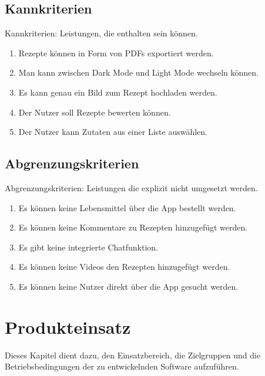 \documentclass[parskip=full]{scrartcl}
\begin{document}
\subsection{Kannkriterien}
Kannkriterien: Leistungen, die enthalten sein können.

\begin{enumerate}[start=1,label={$\langle$\bfseries RC\arabic*$\rangle$}, leftmargin = 5em, itemsep=4pt, parsep=4pt]
    \item Rezepte können in Form von PDFs exportiert werden.
    \item Man kann zwischen Dark Mode und Light Mode wechseln können.
    \item Es kann genau ein Bild zum Rezept hochladen werden.
    \item Der Nutzer soll Rezepte bewerten können. %
    \item Der Nutzer kann Zutaten aus einer Liste auswählen.
\end{enumerate}

\subsection{Abgrenzungskriterien}
Abgrenzungskriterien: Leistungen die explizit nicht umgesetzt werden.

\begin{enumerate}[start=1,label={$\langle$\bfseries RW\arabic*$\rangle$}, leftmargin = 5em, itemsep=4pt, parsep=4pt]
    \item Es können keine Lebensmittel über die App bestellt werden.
    \item Es können keine Kommentare zu Rezepten hinzugefügt werden.
    \item Es gibt keine integrierte Chatfunktion.
    \item Es können keine Videos den Rezepten hinzugefügt werden.
    \item Es können keine Nutzer direkt über die App gesucht werden.
\end{enumerate}

\section{Produkteinsatz}
Dieses Kapitel dient dazu, den Einsatzbereich, die Zielgruppen und die Betriebsbedingungen der zu entwickelnden Software aufzuführen.
\end{document}
